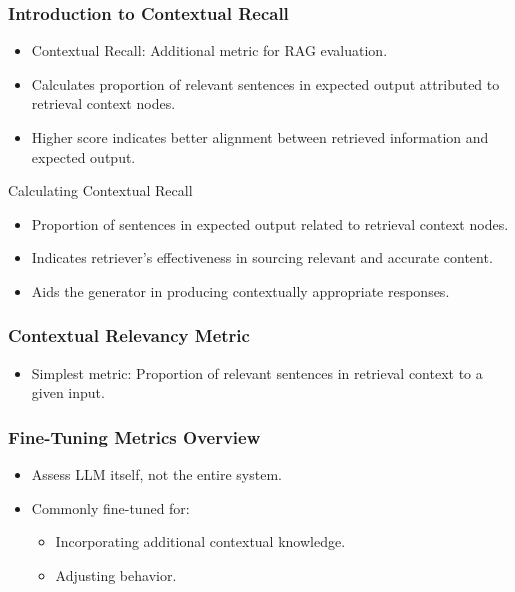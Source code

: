 \begin{frame}[fragile]\frametitle{Introduction to Contextual Recall}
  \begin{itemize}
    \item Contextual Recall: Additional metric for RAG evaluation.
    \item Calculates proportion of relevant sentences in expected output attributed to retrieval context nodes.
    \item Higher score indicates better alignment between retrieved information and expected output.
  \end{itemize}
Calculating Contextual Recall
  \begin{itemize}
    \item Proportion of sentences in expected output related to retrieval context nodes.
    \item Indicates retriever's effectiveness in sourcing relevant and accurate content.
    \item Aids the generator in producing contextually appropriate responses.
  \end{itemize}
\end{frame}

\begin{frame}[fragile]\frametitle{Contextual Relevancy Metric}
  \begin{itemize}
    \item Simplest metric: Proportion of relevant sentences in retrieval context to a given input.
  \end{itemize}
\end{frame}

\begin{frame}[fragile]\frametitle{Fine-Tuning Metrics Overview}
  \begin{itemize}
    \item Assess LLM itself, not the entire system.
    \item Commonly fine-tuned for:
      \begin{itemize}
        \item Incorporating additional contextual knowledge.
        \item Adjusting behavior.
      \end{itemize}
  \end{itemize}
\end{frame}

